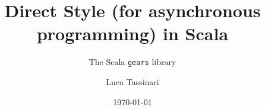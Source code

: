 \documentclass[aspectratio=1610,xcolor=dvipsnames]{beamer}
\title{Direct Style (for asynchronous programming) in Scala}
\subtitle{The Scala \texttt{gears} library}
\author{Luca Tassinari}
\date{\today} %
\begin{document}
\begin{frame}
  \titlepage
\end{frame}


\end{document}
